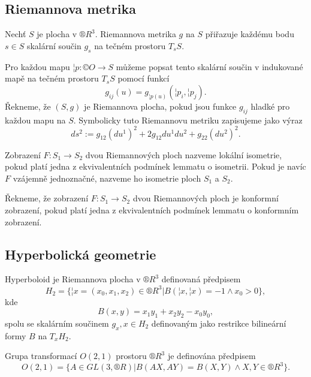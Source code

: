 \documentclass[12pt]{article}                   %
\begin{document}
    \subsection{Riemannova metrika}
        \begin{definice}
            Nechť $S$ je plocha v $®R^3$. Riemannova metrika $g$ na $S$ přiřazuje každému bodu $s \in S$ skalární součin $g_s$ na tečném prostoru $T_sS$.

            Pro každou mapu $¦p: ©O \rightarrow S$ můžeme popsat tento skalární součin v indukované mapě na tečném prostoru $T_sS$ pomocí funkcí
            $$ g_{ij}(u) = g_{¦p(u)}(¦p_i, ¦p_j). $$
            Řekneme, že $(S, g)$ je Riemannova plocha, pokud jsou funkce $g_{ij}$ hladké pro každou mapu na $S$. Symbolicky tuto Riemannovu metriku zapisujeme jako výraz
            $$ ds^2 := g_{12}(du^1)^2 + 2g_{12}du^1du^2 + g_{22}(du^2)^2. $$
        \end{definice}

        \begin{definice}
            Zobrazení $F: S_1 \rightarrow S_2$ dvou Riemannových ploch nazveme lokální isometrie, pokud platí jedna z ekvivalentních podmínek lemmatu o isometrii. Pokud je navíc $F$ vzájemně jednoznačné, nazveme ho isometrie ploch $S_1$ a $S_2$.

            Řekneme, že zobrazení $F: S_1 \rightarrow S_2$ dvou Riemannových ploch je konformní zobrazení, pokud platí jedna z ekvivalentních podmínek lemmatu o konformním zobrazení.
        \end{definice}

    \subsection{Hyperbolická geometrie}
        \begin{definice}[Hyperboloid]
            Hyperboloid je Riemannova plocha v $®R^3$ definovaná předpisem
            $$ H_2 = \{¦x = (x_0, x_1, x_2) \in ®R^3 | B(¦x, ¦x) = -1 \land x_0 > 0\}, $$
            kde
            $$ B(x, y) = x_1y_1 + x_2y_2 - x_0y_0, $$
            spolu se skalárním součinem $g_x, x \in H_2$ definovaným jako restrikce bilineární formy $B$ na $T_xH_2$.
        \end{definice}

        \begin{definice}
            Grupa transformací $O(2, 1)$ prostoru $®R^3$ je definována předpisem
            $$ O(2, 1) = \{A \in GL(3, ®R) | B(AX, AY) = B(X, Y) \land X, Y \in ®R^3\}. $$
        \end{definice}
\end{document}
